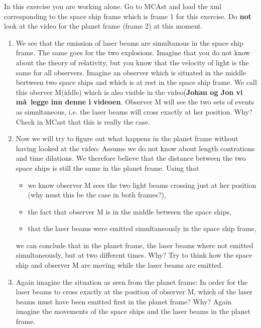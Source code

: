 {\begin{multicols}{2}
In this exercise you are working alone. Go to MCAst and load the xml
corresponding to the space ship frame which is frame 1 for this
exercise. Do {\bf not} look at the video for the planet frame (frame 2) at this moment.


\begin{enumerate}

\item We see that the emission of laser beams are simultanous in the
space ship frame. The same goes for the two explosions. Imagine that
you do not know about the theory of relativity, but you know that the
velocity of light is the same for all observers. Imagine an observer
which is situated in the middle bertween two space ships and which is
at rest in the space ship frame. We call this oberver M(iddle) which
is also visible in the video({\bf Johan og Jon vi m\aa\ legge inn
denne i videoen}. Observer M will see the two sets of events as simultaneous, i.e. the laser beams will cross exactly at her position. Why? Check in MCast that this is really the case.

\item Now we will try to figure out what happens in the planet frame
without having looked at the video:  Assume we do not know about
 length contrations and time dilations. We therefore believe that the
 distance between the two space ships is still the same in the planet
 frame. Using that
\begin{itemize}
\item we know observer M sees the two light beams crossing
 just at her position (why must this be the case in both frames?),
\item  the fact that observer M is in the middle between the space ships,
\item  that the laser beams were emitted simultaneously in the space
ship frame, 
\end{itemize}
we can conclude that in the planet frame, the laser beams where not
emitted simultaneously, but at two different times. Why?
Try to think how the space ship and observer M are moving while the
laser beams are emitted.

\item Again imagine the situation as seen from the planet frame: In
order for the laser beams to cross exactly at the position of observer
M, which of the laser beams must have been emitted first in the planet
frame? Why? Again imagine the movements of the space ships and the
laser beams in the planet frame.


\end{enumerate}
\end{multicols}}
